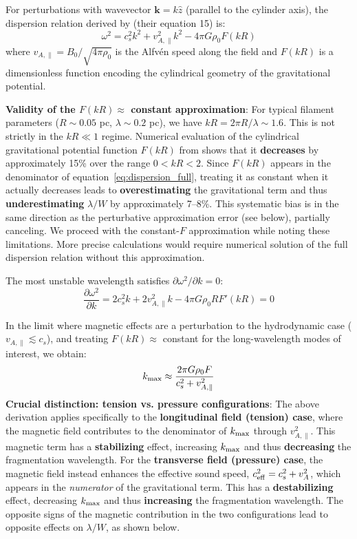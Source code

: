 \documentclass[11pt,a4paper]{article}
\begin{document}
For perturbations with wavevector $\mathbf{k} = k \hat{z}$ (parallel to the cylinder axis), the dispersion relation derived by \citet{Nakamura1993} (their equation 15) is:
\begin{equation}
\omega^2 = c_s^2 k^2 + v_{A,\parallel}^2 k^2 - 4\pi G \rho_0 F(kR)
\label{eq:dispersion_full}
\end{equation}
where $v_{A,\parallel} = B_0/\sqrt{4\pi\rho_0}$ is the Alfv\'en speed along the field and $F(kR)$ is a dimensionless function encoding the cylindrical geometry of the gravitational potential.

\textbf{Validity of the $F(kR) \approx$ constant approximation}: For typical filament parameters ($R \sim 0.05$ pc, $\lambda \sim 0.2$ pc), we have $kR = 2\pi R/\lambda \sim 1.6$. This is not strictly in the $kR \ll 1$ regime. Numerical evaluation of the cylindrical gravitational potential function $F(kR)$ from \citet{Nakamura1993} shows that it \textbf{decreases} by approximately 15\% over the range $0 < kR < 2$. Since $F(kR)$ appears in the denominator of equation~\ref{eq:dispersion_full}, treating it as constant when it actually decreases leads to \textbf{overestimating} the gravitational term and thus \textbf{underestimating} $\lambda/W$ by approximately 7--8\%. This systematic bias is in the same direction as the perturbative approximation error (see below), partially canceling. We proceed with the constant-$F$ approximation while noting these limitations. More precise calculations would require numerical solution of the full dispersion relation without this approximation.

The most unstable wavelength satisfies $\partial \omega^2 / \partial k = 0$:
\begin{equation}
\frac{\partial \omega^2}{\partial k} = 2c_s^2 k + 2v_{A,\parallel}^2 k - 4\pi G \rho_0 R F'(kR) = 0
\end{equation}

In the limit where magnetic effects are a perturbation to the hydrodynamic case ($v_{A,\parallel} \lesssim c_s$), and treating $F(kR) \approx$ constant for the long-wavelength modes of interest, we obtain:
\begin{equation}
k_{\rm max} \approx \frac{2\pi G \rho_0 F}{c_s^2 + v_{A,\parallel}^2}
\end{equation}
\textbf{Crucial distinction: tension vs. pressure configurations}: The above derivation applies specifically to the \textbf{longitudinal field (tension) case}, where the magnetic field contributes to the denominator of $k_{\rm max}$ through $v_{A,\parallel}^2$. This magnetic term has a \textbf{stabilizing} effect, increasing $k_{\rm max}$ and thus \textbf{decreasing} the fragmentation wavelength. For the \textbf{transverse field (pressure) case}, the magnetic field instead enhances the effective sound speed, $c_{\rm eff}^2 = c_s^2 + v_A^2$, which appears in the \textit{numerator} of the gravitational term. This has a \textbf{destabilizing} effect, decreasing $k_{\rm max}$ and thus \textbf{increasing} the fragmentation wavelength. The opposite signs of the magnetic contribution in the two configurations lead to opposite effects on $\lambda/W$, as shown below.
\end{document}
